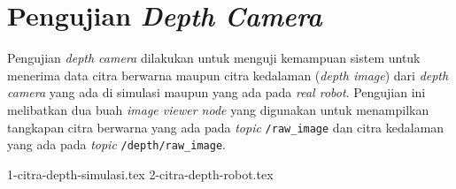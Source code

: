 \section{Pengujian \emph{Depth Camera}}
\label{sec:pengujiandepthcamera}

Pengujian \emph{depth camera} dilakukan untuk menguji kemampuan sistem untuk menerima data citra berwarna maupun citra kedalaman (\emph{depth image}) dari \emph{depth camera} yang ada di simulasi maupun yang ada pada \emph{real robot}.
Pengujian ini melibatkan dua buah \emph{image viewer node} yang digunakan untuk menampilkan tangkapan citra berwarna yang ada pada \emph{topic} \lstinline{/raw_image} dan citra kedalaman yang ada pada \emph{topic} \lstinline{/depth/raw_image}.

{1-citra-depth-simulasi.tex}
{2-citra-depth-robot.tex}

